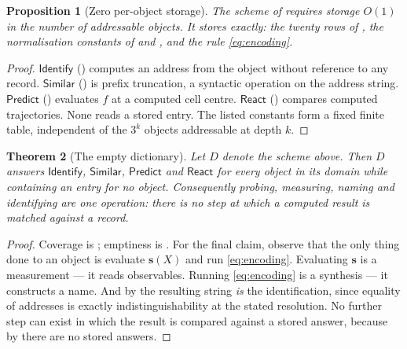 \documentclass[11pt,twocolumn,a4paper]{article}
\theoremstyle{thmstyle}
\newtheorem{theorem}{Theorem}[section]
\newtheorem{proposition}[theorem]{Proposition}
\theoremstyle{definition}
\theoremstyle{remark}
\begin{document}
\begin{proposition}[Zero per-object storage]
\label{prop:storage}
The scheme of
 requires storage
$O(1)$ in the number of addressable objects. It stores exactly: the
twenty rows of , the normalisation constants of
 and , and the rule
\eqref{eq:encoding}.
\end{proposition}

\begin{proof}
$\textsf{Identify}$ () computes an address from the
object without reference to any record. $\textsf{Similar}$
() is prefix truncation, a syntactic operation on the
address string. $\textsf{Predict}$ () evaluates $f$
at a computed cell centre. $\textsf{React}$ ()
compares computed trajectories. None reads a stored entry. The listed
constants form a fixed finite table, independent of the $3^k$ objects
addressable at depth $k$.
\end{proof}

\begin{theorem}[The empty dictionary]
\label{thm:empty-dictionary}
Let $D$ denote the scheme above. Then $D$ answers $\textsf{Identify}$,
$\textsf{Similar}$, $\textsf{Predict}$ and $\textsf{React}$ for every
object in its domain while containing an entry for no object.
Consequently probing, measuring, naming and identifying are one
operation: there is no step at which a computed result is matched
against a record.
\end{theorem}

\begin{proof}
Coverage is
; emptiness is
. For the final claim, observe that the only thing
done to an object is evaluate $\mathbf{s}(X)$ and run
\eqref{eq:encoding}. Evaluating $\mathbf{s}$ is a measurement --- it
reads observables. Running \eqref{eq:encoding} is a synthesis --- it
constructs a name. And by  the resulting string
\emph{is} the identification, since equality of addresses is exactly
indistinguishability at the stated resolution. No further step can
exist in which the result is compared against a stored answer, because
by  there are no stored answers.
\end{proof}
\end{document}
